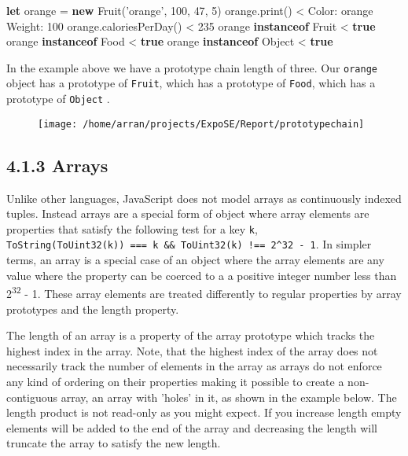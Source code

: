 \documentclass[]{article}
\newenvironment{Shaded}{}{}
\newcommand{\AttributeTok}[1]{\textcolor[rgb]{0.49,0.56,0.16}{#1}}
\newcommand{\DecValTok}[1]{\textcolor[rgb]{0.25,0.63,0.44}{#1}}
\newcommand{\KeywordTok}[1]{\textcolor[rgb]{0.00,0.44,0.13}{\textbf{#1}}}
\newcommand{\NormalTok}[1]{#1}
\newcommand{\OperatorTok}[1]{\textcolor[rgb]{0.40,0.40,0.40}{#1}}
\newcommand{\StringTok}[1]{\textcolor[rgb]{0.25,0.44,0.63}{#1}}
\newcommand{\VariableTok}[1]{\textcolor[rgb]{0.10,0.09,0.49}{#1}}
\begin{document}
\begin{Shaded}
\begin{Highlighting}[]
\KeywordTok{let}\NormalTok{ orange }\OperatorTok{=} \KeywordTok{new} \AttributeTok{Fruit}\NormalTok{(}\StringTok{'orange'}\OperatorTok{,} \DecValTok{100}\OperatorTok{,} \DecValTok{47}\OperatorTok{,} \DecValTok{5}\NormalTok{)}
\VariableTok{orange}\NormalTok{.}\AttributeTok{print}\NormalTok{()}
\OperatorTok{<}\NormalTok{ Color}\OperatorTok{:}\NormalTok{ orange Weight}\OperatorTok{:} \DecValTok{100}
\VariableTok{orange}\NormalTok{.}\AttributeTok{caloriesPerDay}\NormalTok{()}
\OperatorTok{<} \DecValTok{235}
\NormalTok{orange }\KeywordTok{instanceof}\NormalTok{ Fruit}
\OperatorTok{<} \KeywordTok{true}
\NormalTok{orange }\KeywordTok{instanceof}\NormalTok{ Food}
\OperatorTok{<} \KeywordTok{true}
\NormalTok{orange }\KeywordTok{instanceof}\NormalTok{ Object}
\OperatorTok{<} \KeywordTok{true}
\end{Highlighting}
\end{Shaded}

In the example above we have a prototype chain length of three. Our
\texttt{orange} object has a prototype of \texttt{Fruit}, which has a
prototype of \texttt{Food}, which has a prototype of \texttt{Object} .

\begin{figure}
\centering
\texttt{[image: /home/arran/projects/ExpoSE/Report/prototypechain]}
\caption{}
\end{figure}

\hypertarget{header-n185}{%
\subsection{4.1.3 Arrays}\label{header-n185}}

Unlike other languages, JavaScript does not model arrays as continuously
indexed tuples. Instead arrays are a special form of object where array
elements are properties that satisfy the following test for a key
\texttt{k},
\texttt{ToString(ToUint32(k))\ ===\ k\ \&\&\ ToUint32(k)\ !==\ 2\^{}32\ -\ 1}.
In simpler terms, an array is a special case of an object where the
array elements are any value where the property can be coerced to a a
positive integer number less than 2\textsuperscript{32} - 1. These array
elements are treated differently to regular properties by array
prototypes and the length property.

The length of an array is a property of the array prototype which tracks
the highest index in the array. Note, that the highest index of the
array does not necessarily track the number of elements in the array as
arrays do not enforce any kind of ordering on their properties making it
possible to create a non-contiguous array, an array with 'holes' in it,
as shown in the example below. The length product is not read-only as
you might expect. If you increase length empty elements will be added to
the end of the array and decreasing the length will truncate the array
to satisfy the new length.
\end{document}
